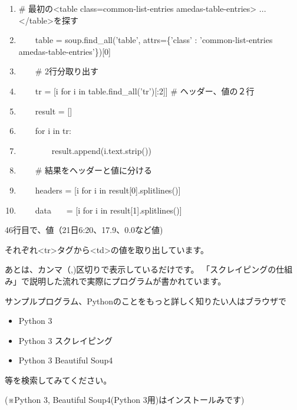 \documentclass[a4paper,12pt,dvipdfmx]{jarticle}
\begin{document}
\begin{center}
\begin{boxedminipage}{17.658cm}
\begin{enumerate}
\setlength{\itemsep}{0cm} %
\baselineskip 10pt
\setcounter{enumi}{36}
\item \# 最初の{\textless}table class={\textquotedbl}common-list-entries
amedas-table-entries{\textquotedbl}{\textgreater} ... {\textless}/table{\textgreater}を探す
\item \ \ \ \ table = soup.find\_all('table', attrs=\{'class' : 'common-list-entries amedas-table-entries'\})[0]
\item \ \ \ \ \# 2行分取り出す
\item \ \ \ \ tr = [i for i in table.find\_all('tr')[:2]] \#
ヘッダー、値の２行
\item \ \ \ \ result = []
\item \ \ \ \ for i in tr:
\item \ \ \ \ \ \ \ \ result.append(i.text.strip())
\item \ \ \ \ \# 結果をヘッダーと値に分ける
\item \ \ \ \ headers = [i for i in result[0].splitlines()]
\item \ \ \ \ data \ \ \ = [i for i in result[1].splitlines()]
\end{enumerate}
\end{boxedminipage}
\end{center}
46行目で、値（21日6:20、17.9、0.0など値)

それぞれ{\textless}tr{\textgreater}タグから{\textless}td{\textgreater}の値を取り出しています。


あとは、カンマ（,)区切りで表示しているだけです。
「スクレイピングの仕組み」で説明した流れで実際にプログラムが書かれています。



\bigskip


\bigskip

サンプルプログラム、Pythonのことをもっと詳しく知りたい人はブラウザで

\begin{itemize}
\item Python 3
\item Python 3 スクレイピング
\item Python 3 Beautiful Soup4
\end{itemize}
等を検索してみてください。


(※Python 3, Beautiful Soup4(Python
3用)はインストールみです)
\end{document}
